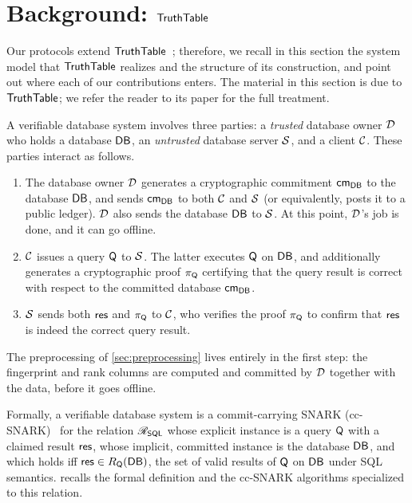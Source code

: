\doclearpage
\section{Background: \texorpdfstring{$\mathsf{TruthTable}$}{TruthTable}}
\label{sec:background}

Our protocols extend $\mathsf{TruthTable}$~\cite{cryptoeprint:2026/1260}; therefore, we recall in this section the system model that $\mathsf{TruthTable}$ realizes and the structure of its construction, and point out where each of our contributions enters. The material in this section is due to $\mathsf{TruthTable}$; we refer the reader to its paper for the full treatment.

A verifiable database system involves three parties: a \emph{trusted} database owner $\mathcal{D}$ who holds a database $\mathsf{DB}$, an \emph{untrusted} database server $\mathcal{S}$, and a client $\mathcal{C}$.
These parties interact as follows.
\begin{enumerate}[nosep]
    \item The database owner $\mathcal{D}$ generates a cryptographic commitment $\mathsf{cm}_{\mathsf{DB}}$ to the database $\mathsf{DB}$, and sends $\mathsf{cm}_{\mathsf{DB}}$ to both $\mathcal{C}$ and $\mathcal{S}$ (or equivalently, posts it to a public ledger).
    $\mathcal{D}$ also sends the database $\mathsf{DB}$ to $\mathcal{S}$.
    At this point, $\mathcal{D}$'s job is done, and it can go offline.
    \item $\mathcal{C}$ issues a query $\mathsf{Q}$ to $\mathcal{S}$. The latter executes $\mathsf{Q}$ on $\mathsf{DB}$, and additionally generates a cryptographic proof $\pi_{\mathsf{Q}}$ certifying that the query result is correct with respect to the committed database $\mathsf{cm}_{\mathsf{DB}}$.
    \item $\mathcal{S}$ sends both $\mathsf{res}$ and $\pi_{\mathsf{Q}}$ to $\mathcal{C}$, who verifies the proof $\pi_{\mathsf{Q}}$ to confirm that $\mathsf{res}$ is indeed the correct query result.
\end{enumerate}
The preprocessing of \cref{sec:preprocessing} lives entirely in the first step: the fingerprint and rank columns are computed and committed by $\mathcal{D}$ together with the data, before it goes offline.

Formally, a verifiable database system is a commit-carrying SNARK (cc-SNARK)~\cite{CampanelliFQ19} for the relation $\mathscr{R}_{\mathsf{SQL}}$ whose explicit instance is a query $\mathsf{Q}$ with a claimed result $\mathsf{res}$, whose implicit, committed instance is the database $\mathsf{DB}$, and which holds iff $\mathsf{res} \in R_{\mathsf{Q}}(\mathsf{DB})$, the set of valid results of $\mathsf{Q}$ on $\mathsf{DB}$ under SQL semantics.  recalls the formal definition and the cc-SNARK algorithms specialized to this relation.

